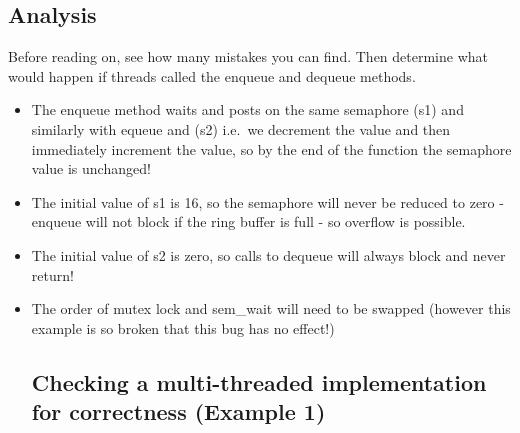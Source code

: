 \begin{Shaded}
\begin{Highlighting}[]
 \NormalTok{*b[}\NormalTok{]}
 
 
    \NormalTok{, }\NormalTok{)}
    \NormalTok{, }\NormalTok{)}
\NormalTok{\}}

 

 
    \NormalTok{b[ (in++) & (N}\NormalTok{) ] = value}

\NormalTok{\}}
 
     \NormalTok{*result = b[(out++) & }\NormalTok{]}
     
\NormalTok{\}}
\end{Highlighting}
\end{Shaded}

\subsection{Analysis}\label{analysis}

Before reading on, see how many mistakes you can find. Then determine
what would happen if threads called the enqueue and dequeue methods.

\begin{itemize}
\item
  The enqueue method waits and posts on the same semaphore (s1) and
  similarly with equeue and (s2) i.e.~we decrement the value and then
  immediately increment the value, so by the end of the function the
  semaphore value is unchanged!
\item
  The initial value of s1 is 16, so the semaphore will never be reduced
  to zero - enqueue will not block if the ring buffer is full - so
  overflow is possible.
\item
  The initial value of s2 is zero, so calls to dequeue will always block
  and never return!
\item
  The order of mutex lock and sem\_wait will need to be swapped (however
  this example is so broken that this bug has no effect!)

  \subsection{Checking a multi-threaded implementation for correctness
  (Example
  1)}\label{checking-a-multi-threaded-implementation-for-correctness-example-1-1}
\end{itemize}

